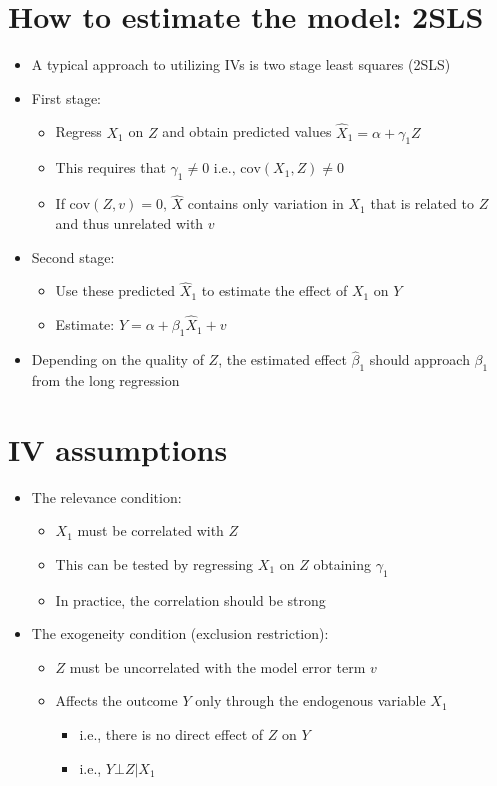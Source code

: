 \documentclass[10pt]{article}
\begin{document}
\section{How to estimate the model: 2SLS}
\begin{itemize}
    \item A typical approach to utilizing IVs is two stage least squares (2SLS)
    \item First stage: 
    \begin{itemize}
        \item Regress $X_1 $ on $Z $ and obtain predicted values $\hat{X}_1 = \alpha + \gamma_1 Z $
        \item This requires that $\gamma_1 \neq 0 \text{ i.e., cov}(X_1, Z) \neq 0 $
        \item If $\text{cov}(Z, v) = 0,\, \hat{X} $ contains only variation in $X_1 $ that is related to $Z $ and thus unrelated with $v $
    \end{itemize}
    \item Second stage: 
    \begin{itemize}
        \item Use these predicted $\hat{X}_1 $ to estimate the effect of $X_1\text{ on } Y $
        \item Estimate: $Y = \alpha + \beta_1\hat{X}_1 + v $
    \end{itemize}
    \item Depending on the quality of $Z $, the estimated effect $\hat{\beta}_1 $ should approach $\beta_1 $ from the long regression 
\end{itemize}
\section{IV assumptions}
\begin{itemize}
    \item The relevance condition: 
    \begin{itemize}
        \item $X_1 $ must be correlated with $Z $
        \item This can be tested by regressing $X_1 $ on $Z $ obtaining $\gamma_1 $
        \item In practice, the correlation should be strong 
    \end{itemize}
    \item The exogeneity condition (exclusion restriction): 
    \begin{itemize}
        \item $Z $ must be uncorrelated with the model error term $v $
        \item Affects the outcome $Y $ only through the endogenous variable $X_1 $
        \begin{itemize}
            \item i.e., there is no direct effect of $Z \text{ on } Y $
            \item i.e., $Y \bot Z|X_1 $
        \end{itemize}
    \end{itemize}
\end{itemize}
\newpage 
\end{document}
